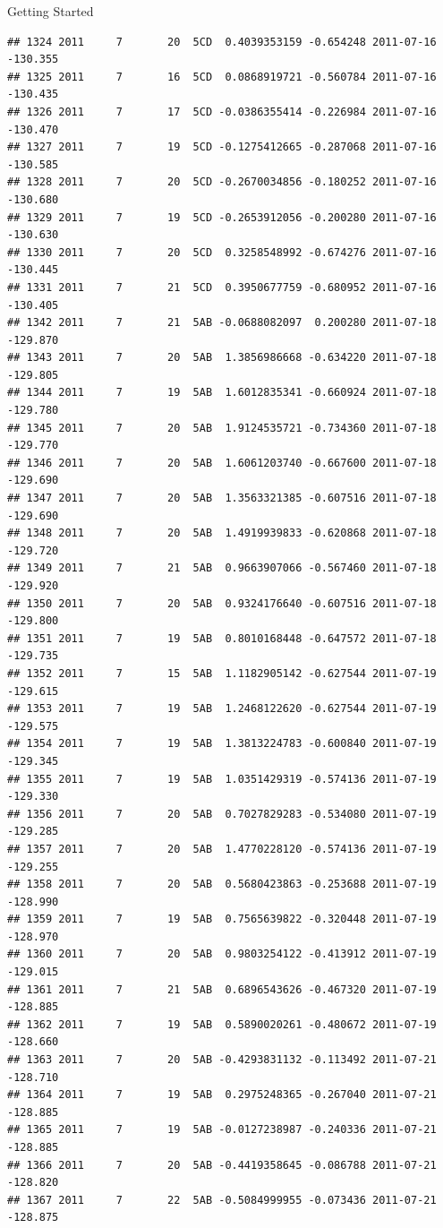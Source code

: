 \documentclass[
  ignorenonframetext,
]{beamer}
\begin{document}
\begin{frame}[fragile]{Getting Started}
\begin{verbatim}
## 1324 2011     7       20  5CD  0.4039353159 -0.654248 2011-07-16 -130.355
## 1325 2011     7       16  5CD  0.0868919721 -0.560784 2011-07-16 -130.435
## 1326 2011     7       17  5CD -0.0386355414 -0.226984 2011-07-16 -130.470
## 1327 2011     7       19  5CD -0.1275412665 -0.287068 2011-07-16 -130.585
## 1328 2011     7       20  5CD -0.2670034856 -0.180252 2011-07-16 -130.680
## 1329 2011     7       19  5CD -0.2653912056 -0.200280 2011-07-16 -130.630
## 1330 2011     7       20  5CD  0.3258548992 -0.674276 2011-07-16 -130.445
## 1331 2011     7       21  5CD  0.3950677759 -0.680952 2011-07-16 -130.405
## 1342 2011     7       21  5AB -0.0688082097  0.200280 2011-07-18 -129.870
## 1343 2011     7       20  5AB  1.3856986668 -0.634220 2011-07-18 -129.805
## 1344 2011     7       19  5AB  1.6012835341 -0.660924 2011-07-18 -129.780
## 1345 2011     7       20  5AB  1.9124535721 -0.734360 2011-07-18 -129.770
## 1346 2011     7       20  5AB  1.6061203740 -0.667600 2011-07-18 -129.690
## 1347 2011     7       20  5AB  1.3563321385 -0.607516 2011-07-18 -129.690
## 1348 2011     7       20  5AB  1.4919939833 -0.620868 2011-07-18 -129.720
## 1349 2011     7       21  5AB  0.9663907066 -0.567460 2011-07-18 -129.920
## 1350 2011     7       20  5AB  0.9324176640 -0.607516 2011-07-18 -129.800
## 1351 2011     7       19  5AB  0.8010168448 -0.647572 2011-07-18 -129.735
## 1352 2011     7       15  5AB  1.1182905142 -0.627544 2011-07-19 -129.615
## 1353 2011     7       19  5AB  1.2468122620 -0.627544 2011-07-19 -129.575
## 1354 2011     7       19  5AB  1.3813224783 -0.600840 2011-07-19 -129.345
## 1355 2011     7       19  5AB  1.0351429319 -0.574136 2011-07-19 -129.330
## 1356 2011     7       20  5AB  0.7027829283 -0.534080 2011-07-19 -129.285
## 1357 2011     7       20  5AB  1.4770228120 -0.574136 2011-07-19 -129.255
## 1358 2011     7       20  5AB  0.5680423863 -0.253688 2011-07-19 -128.990
## 1359 2011     7       19  5AB  0.7565639822 -0.320448 2011-07-19 -128.970
## 1360 2011     7       20  5AB  0.9803254122 -0.413912 2011-07-19 -129.015
## 1361 2011     7       21  5AB  0.6896543626 -0.467320 2011-07-19 -128.885
## 1362 2011     7       19  5AB  0.5890020261 -0.480672 2011-07-19 -128.660
## 1363 2011     7       20  5AB -0.4293831132 -0.113492 2011-07-21 -128.710
## 1364 2011     7       19  5AB  0.2975248365 -0.267040 2011-07-21 -128.885
## 1365 2011     7       19  5AB -0.0127238987 -0.240336 2011-07-21 -128.885
## 1366 2011     7       20  5AB -0.4419358645 -0.086788 2011-07-21 -128.820
## 1367 2011     7       22  5AB -0.5084999955 -0.073436 2011-07-21 -128.875

\end{verbatim}
\end{frame}
\end{document}
